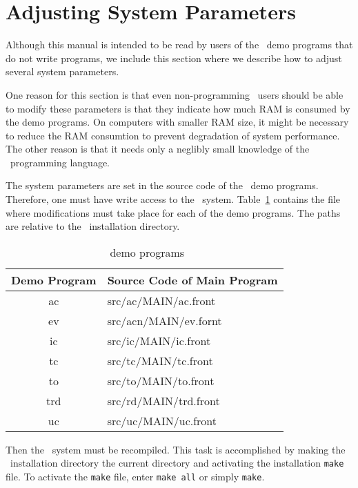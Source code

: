 \section{Adjusting System Parameters}

Although this manual is intended to be read by users of the \redux\
demo programs that do not write programs, we include this section where
we describe how to adjust several system parameters.

One reason for this section is that even non-programming \redux\ users should
be able to modify these parameters is that they indicate how much RAM is
consumed by the demo programs. On computers with smaller RAM size,
it might be necessary to reduce the RAM consumtion to prevent degradation
of system performance.
The other reason is that it needs only a neglibly small knowledge of
the \ALDES\ programming language.

The system parameters are set in the source code of the \redux\ demo programs.
Therefore, one must have write access to the \redux\ system.
Table~\ref{tab:ReDuXMainProgramFiles} contains the file where modifications
must take place for each of the demo programs. The paths are relative to
the \redux\ installation directory.

\begin{table}[htbp]
\begin{center}
\begin{tabular}{|c||l|}
\hline
Demo Program & Source Code of Main Program\\ \hline
ac & src/ac/MAIN/ac.front\\
ev & src/acn/MAIN/ev.fornt\\
ic & src/ic/MAIN/ic.front\\
tc & src/tc/MAIN/tc.front\\
to & src/to/MAIN/to.front\\
trd & src/rd/MAIN/trd.front\\
uc & src/uc/MAIN/uc.front\\ \hline
\end{tabular}
\caption{\redux\ demo programs}\label{tab:ReDuXMainProgramFiles}
\end{center}
\end{table}

Then the \redux\ system must be recompiled. This task is accomplished
by making the \redux\ installation directory the current directory
and activating the installation {\tt make} file. To activate the
{\tt make} file, enter {\tt make all} or simply {\tt make}.

